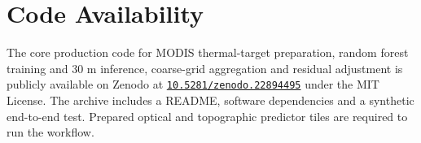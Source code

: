 \section{Code Availability}

The core production code for MODIS thermal-target preparation, random forest training and 30 m inference, coarse-grid aggregation and residual adjustment is publicly available on Zenodo\supercite{liang2026chinatherm30code} at \href{https://doi.org/10.5281/zenodo.22894495}{\nolinkurl{10.5281/zenodo.22894495}} under the MIT License. The archive includes a README, software dependencies and a synthetic end-to-end test. Prepared optical and topographic predictor tiles are required to run the workflow.
